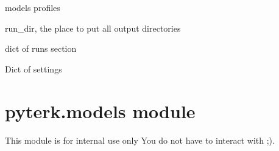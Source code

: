\documentclass[letterpaper,10pt,english]{sphinxmanual}
\begin{document}
\begin{fulllineitems}
\label{\detokenize{pyterk:pyterk.config.models}}
\sphinxAtStartPar
models profiles

\end{fulllineitems}


\begin{fulllineitems}
\label{\detokenize{pyterk:pyterk.config.run_dir}}
\sphinxAtStartPar
run\_dir, the place to put all output directories

\end{fulllineitems}


\begin{fulllineitems}
\label{\detokenize{pyterk:pyterk.config.runs}}
\sphinxAtStartPar
dict of runs section

\end{fulllineitems}


\begin{fulllineitems}
\label{\detokenize{pyterk:pyterk.config.settings}}
\sphinxAtStartPar
Dict of settings

\end{fulllineitems}



\section{pyterk.models module}
\label{\detokenize{pyterk:module-pyterk.models}}\label{\detokenize{pyterk:pyterk-models-module}}
\sphinxAtStartPar
This module is for internal use only \sphinxhyphen{} You do not have to interact with ;\sphinxhyphen{}).
\end{document}
